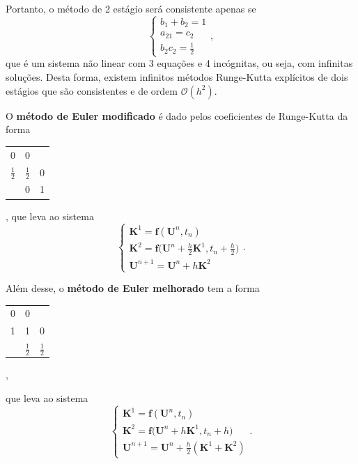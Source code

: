 \documentclass[../differential_methods.tex]{subfiles}
\begin{document}
Portanto, o método de 2 estágio será consistente apenas se
\[
	\left\{\begin{array}{ll}
		b_1 + b_2 = 1 \\
		a_{21} = c_2  \\
		b_2c_2 = \frac{1}{2}
	\end{array}\right.,
\]
que é um sistema não linear com 3 equações e 4 incógnitas, ou seja, com infinitas soluções. Desta forma, existem infinitos métodos Runge-Kutta explícitos de dois estágios que são consistentes e de ordem \(\mathcal{O}(h^{2})\).

\begin{example}
	O \textbf{método de Euler modificado} é dado pelos coeficientes de Runge-Kutta da forma
	\begin{table}[H]
		\centering
		\begin{tabular}{c | c c}
			0               & 0               &   \\
			\(\frac{1}{2}\) & \(\frac{1}{2}\) & 0 \\
			\hline
			                & 0               & 1
		\end{tabular}
	\end{table},
	que leva ao sistema
	\[
		\left\{\begin{array}{ll}
			\mathbf{K}^{1} = \mathbf{f}(\mathbf{U}^{n}, t_{n})                                                     \\
			\mathbf{K}^{2} = \mathbf{f}\bigl(\mathbf{U}^{n} + \frac{h}{2} \mathbf{K}^{1}, t_{n}+ \frac{h}{2}\bigr) \\
			\mathbf{U}^{n+1} = \mathbf{U}^{n} + h \mathbf{K}^{2}
		\end{array}\right..
	\]

	\pagebreak
	Além desse, o \textbf{método de Euler melhorado} tem a forma
	\begin{table}[H]
		\centering
		\begin{tabular}{c | c c}
			0 & 0               &                 \\
			1 & 1               & 0               \\
			\hline
			  & \(\frac{1}{2}\) & \(\frac{1}{2}\)
		\end{tabular},
	\end{table}
	que leva ao sistema
	\[
		\left\{\begin{array}{ll}
			\mathbf{K}^{1} = \mathbf{f}(\mathbf{U}^{n}, t_{n})                                \\
			\mathbf{K}^{2} = \mathbf{f}\bigl(\mathbf{U}^{n} + h\mathbf{K}^{1}, t_{n}+ h\bigr) \\
			\mathbf{U}^{n+1} = \mathbf{U}^{n} + \frac{h}{2} (\mathbf{K}^{1} + \mathbf{K}^{2})
		\end{array}\right..
	\]
\end{example}
\end{document}
